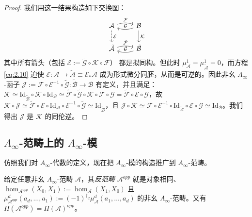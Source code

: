 \begin{proof}
我们用这一结果构造如下交换图：
\[
  \begin{tikzcd}
    \mathcal A \arrow[r, bend left=18, "\mathcal F"]
      \arrow[d, dashed, "\mathcal E"]
    & \mathcal B \arrow[l, bend left=18, "\mathcal G"']
      \arrow[d, "\mathcal K"] \\
    \tilde{\mathcal A} \arrow[r, bend left=18, "\tilde{\mathcal F}"]
    & \tilde{\mathcal B} \arrow[l, bend left=18, "\tilde{\mathcal G}"']
  \end{tikzcd}
\]
其中所有箭头（包括 $\mathcal E:=\tilde{\mathcal G}\circ\mathcal K\circ\mathcal F$）
都是拟同构。但此时 $\mu^1_{\mathcal A}=\mu^1_{\tilde{\mathcal A}}=0$，而方程
\eqref{eq:2.10} 迫使 $\mathcal E:\mathcal A\to\tilde{\mathcal A}\equiv
\mathcal E_*\mathcal A$ 成为形式微分同胚，从而是可逆的。因此非幺 $A_\infty$-函子
$\mathcal J:=\mathcal F\circ\mathcal E^{-1}\circ\tilde{\mathcal G}:
\tilde{\mathcal B}\to\mathcal B$ 有定义，并且满足：
$\mathcal K\simeq\mathrm{Id}_{\tilde{\mathcal B}}\circ\mathcal K\circ
\mathrm{Id}_{\mathcal B}\simeq\tilde{\mathcal F}\circ\tilde{\mathcal G}\circ
\mathcal K\circ\mathcal F\circ\mathcal G=\tilde{\mathcal F}\circ\mathcal E\circ
\mathcal G$，故 $\mathcal K\circ\mathcal J\simeq\tilde{\mathcal F}\circ\mathcal E
\circ\mathrm{Id}_{\mathcal A}\circ\mathcal E^{-1}\circ\tilde{\mathcal G}\simeq
\mathrm{Id}_{\tilde{\mathcal B}}$，且 $\mathcal J\circ\mathcal K\simeq\mathcal F
\circ\mathcal E^{-1}\circ\mathrm{Id}_{\tilde{\mathcal A}}\circ\mathcal E\circ
\mathcal G\simeq\mathrm{Id}_{\mathcal B}$。我们得出 $\mathcal J$ 是 $\mathcal K$
的同伦逆。
\end{proof}

\subsection{$A_\infty$-范畴上的 $A_\infty$-模}\label{sec:2.6}

仿照我们对 $A_\infty$-代数的定义，现在把 $A_\infty$-模的构造推广到 $A_\infty$-范畴。

给定任意非幺 $A_\infty$-范畴 $\mathcal A$，其\emph{反范畴} $\mathcal A^{opp}$
就是对象相同、$\hom_{\mathcal A^{opp}}(X_0,X_1):=\hom_{\mathcal A}(X_1,X_0)$ 且
$\mu^d_{\mathcal A^{opp}}(a_d,\dots,a_1):=(-1)^{\dagger_d}\mu^d_{\mathcal A}
(a_1,\dots,a_d)$ 的非幺 $A_\infty$-范畴。又有
$H(\mathcal A^{opp})=H(\mathcal A)^{opp}$。


